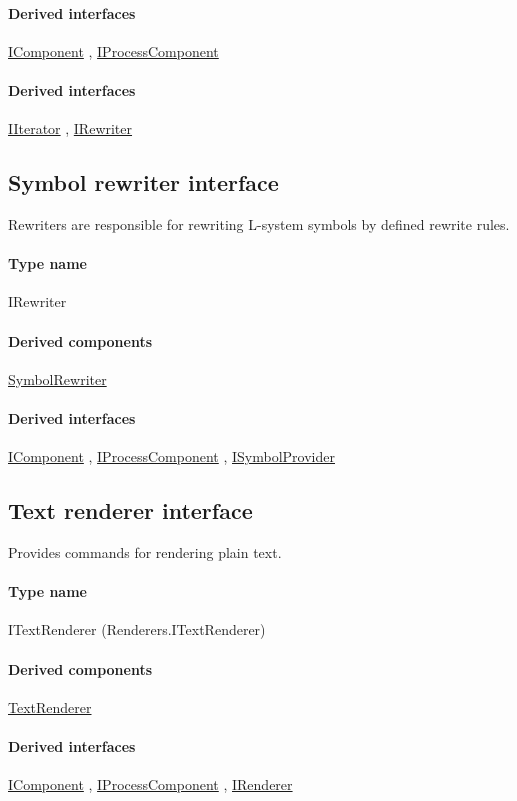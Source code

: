 	\paragraph{Derived interfaces}
		\hyperref[Malsys.Processing.Components.IComponent]{IComponent}%
, 		\hyperref[Malsys.Processing.Components.IProcessComponent]{IProcessComponent}%
	\paragraph{Derived interfaces}
		\hyperref[Malsys.Processing.Components.IIterator]{IIterator}%
, 		\hyperref[Malsys.Processing.Components.IRewriter]{IRewriter}%
	

\subsection{Symbol rewriter interface}
\label{Malsys.Processing.Components.IRewriter}
Rewriters are responsible for rewriting L-system symbols by defined rewrite rules.\paragraph{Type name}
IRewriter	\paragraph{Derived components}
		\hyperref[Malsys.Processing.Components.Rewriters.SymbolRewriter]{SymbolRewriter}%
	\paragraph{Derived interfaces}
		\hyperref[Malsys.Processing.Components.IComponent]{IComponent}%
, 		\hyperref[Malsys.Processing.Components.IProcessComponent]{IProcessComponent}%
, 		\hyperref[Malsys.Processing.Components.ISymbolProvider]{ISymbolProvider}%
	

\subsection{Text renderer interface}
\label{Malsys.Processing.Components.Renderers.ITextRenderer}
Provides commands for rendering plain text.\paragraph{Type name}
ITextRenderer (Renderers.ITextRenderer) 	\paragraph{Derived components}
		\hyperref[Malsys.Processing.Components.Renderers.TextRenderer]{TextRenderer}%
	\paragraph{Derived interfaces}
		\hyperref[Malsys.Processing.Components.IComponent]{IComponent}%
, 		\hyperref[Malsys.Processing.Components.IProcessComponent]{IProcessComponent}%
, 		\hyperref[Malsys.Processing.Components.IRenderer]{IRenderer}%
